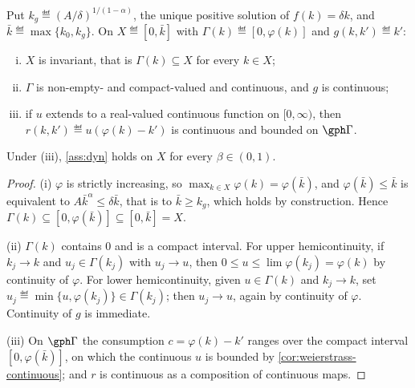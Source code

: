 \begin{lemma}\label{lem:ramsey-standing}
	Put $k_{g}\eqdef(A/\delta)^{1/(1-\alpha)}$, the unique positive solution of
	$f(k)=\delta k$, and $\bar k\eqdef\max\{k_0,k_{g}\}$. On $X\eqdef[0,\bar k]$
	with $\Gamma(k)\eqdef[0,\varphi(k)]$ and $g(k,k')\eqdef k'$:
	\begin{enumerate}[(i)]
		\item $X$ is invariant, that is $\Gamma(k)\subseteq X$ for every $k\in X$;
		\item $\Gamma$ is non-empty- and compact-valued and continuous, and $g$ is
		      continuous;
		\item if $u$ extends to a real-valued continuous function on $[0,\infty)$,
		      then $r(k,k')\eqdef u(\varphi(k)-k')$ is continuous and bounded on
		      $\gph\Gamma$.
	\end{enumerate}
	Under (iii), \autoref{ass:dyn} holds on $X$ for every $\beta\in(0,1)$.
\end{lemma}

\begin{proof}
	(i) $\varphi$ is strictly increasing, so
	$\max_{k\in X}\varphi(k)=\varphi(\bar k)$, and
	$\varphi(\bar k)\leq\bar k$ is equivalent to $A\bar k^{\alpha}\leq\delta\bar k$,
	that is to $\bar k\geq k_{g}$, which holds by construction. Hence
	$\Gamma(k)\subseteq[0,\varphi(\bar k)]\subseteq[0,\bar k]=X$.

	(ii) $\Gamma(k)$ contains $0$ and is a compact interval. For upper
	hemicontinuity, if $k_j\to k$ and $u_j\in\Gamma(k_j)$ with $u_j\to u$, then
	$0\leq u\leq\lim\varphi(k_j)=\varphi(k)$ by continuity of $\varphi$. For lower
	hemicontinuity, given $u\in\Gamma(k)$ and $k_j\to k$, set
	$u_j\eqdef\min\{u,\varphi(k_j)\}\in\Gamma(k_j)$; then $u_j\to u$, again by
	continuity of $\varphi$. Continuity of $g$ is immediate.

	(iii) On $\gph\Gamma$ the consumption $c=\varphi(k)-k'$ ranges over the
	compact interval $[0,\varphi(\bar k)]$, on which the continuous $u$ is bounded
	by \autoref{cor:weierstrass-continuous}; and $r$ is continuous as a
	composition of continuous maps.
\end{proof}

